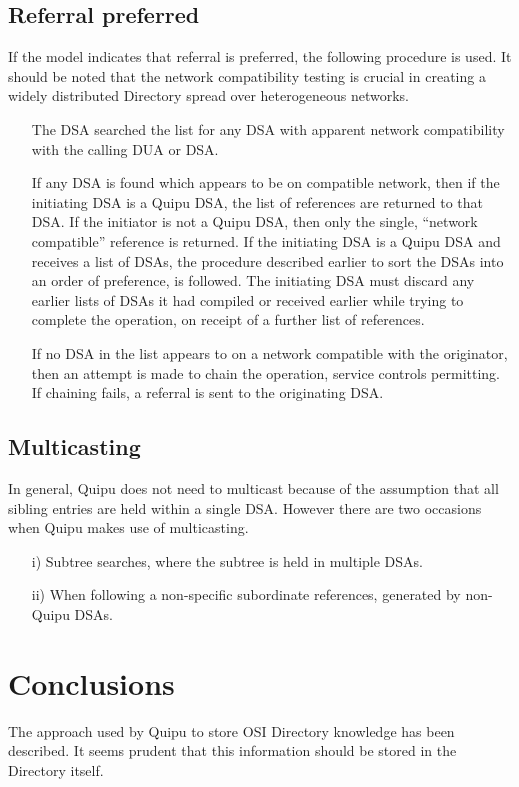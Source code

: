 \subsection{Referral preferred}
If the model indicates that referral is preferred, the following procedure
is used.  It should be noted that the network compatibility testing is
crucial in creating a widely distributed Directory spread over
heterogeneous networks.
\begin{itemize}
\item[{}]
The DSA searched the list for any DSA with apparent network compatibility
with the calling DUA or DSA.
\item[{}]
If any DSA is found which appears to be on compatible network, then if 
the initiating DSA is a Quipu DSA, the list of references are returned
to that DSA. If the initiator is not a Quipu DSA, then only the single,
``network compatible'' reference is returned.  If the initiating DSA is a Quipu
DSA and receives a list of DSAs, the procedure described earlier to sort the
DSAs into an order of preference, is followed.  The initiating DSA must
discard any earlier lists of DSAs it had compiled or received earlier while
trying to
complete the operation, on receipt of a further list of references.
\item[{}]
If no DSA in the list appears to on a network compatible with the
originator, then an attempt is made to chain the operation, service controls
permitting.  If chaining fails, a referral is sent to the originating DSA.
\end{itemize}
\subsection{Multicasting}
In general, Quipu does not need to multicast because of the assumption that all
sibling entries are held within a single DSA.
However there are two occasions when Quipu makes use of multicasting.
\begin{itemize}
\item[{i)}]
Subtree searches, where the subtree is held in multiple DSAs.
\item[{ii)}]
When following a non-specific subordinate references, generated by non-Quipu
DSAs.
\end{itemize}
\section{Conclusions}
The approach used by Quipu to store OSI Directory knowledge has been described.
It seems prudent that this information should be stored in the Directory
itself.

